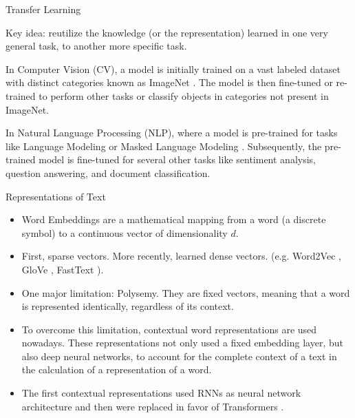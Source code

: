 \documentclass[aspectratio=169,xcolor=dvipsnames]{beamer}
\newenvironment{wideitemize}{\itemize\addtolength{\itemsep}{10pt}}{\enditemize}
\begin{document}
\begin{frame}{Transfer Learning}

\begin{wideitemize}
    \item Key idea: reutilize the knowledge (or the representation) learned in one very general task, to another more specific task.
    \item In Computer Vision (CV), a model is initially trained on a vast labeled dataset with distinct categories known as ImageNet \citep{imagenet-2009, russakovsky2015imagenet, ridnik2021imagenet21k}. The model is then fine-tuned or re-trained to perform other tasks or classify objects in categories not present in ImageNet.
    \item In Natural Language Processing (NLP), where a model is pre-trained for tasks like Language Modeling \citep{radford2018improving, radford2019language, brown-gpt3} or Masked Language Modeling \citep{devlin-etal-2019-bert, albert-zhenzhong, liu-roberta}. Subsequently, the pre-trained model is fine-tuned for several other tasks like sentiment analysis, question answering, and document classification.
\end{wideitemize}

\end{frame}
\begin{frame}{Representations of Text}

\begin{itemize}
    \item Word Embeddings are a mathematical mapping from a word (a discrete symbol) to a continuous vector of dimensionality $d$.
    \item First, sparse vectors. More recently, learned dense vectors. (e.g. Word2Vec \citep{mikolov2013distributed}, GloVe \citep{pennington2014glove}, FastText \citep{bojanowski2017enriching}).
    \item One major limitation: Polysemy. They are fixed vectors, meaning that a word is represented identically, regardless of its context.
    \item To overcome this limitation, contextual word representations are used nowadays. These representations not only used a fixed embedding layer, but also deep neural networks, to account for the complete context of a text in the calculation of a representation of a word.
    \item The first contextual representations used RNNs \citep{peters-etal-2018-deep} as neural network architecture and then were replaced in favor of Transformers \citep{devlin-etal-2019-bert}.
\end{itemize}

\end{frame}
\end{document}
